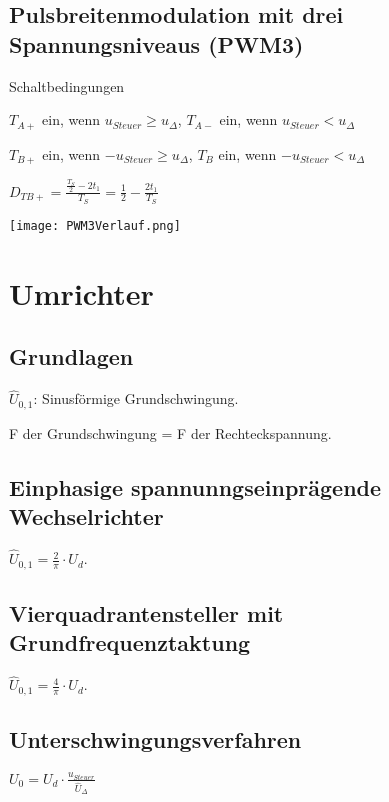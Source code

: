 \documentclass[german]{latex4ei/latex4ei_sheet}
\begin{document}
	\begin{sectionbox}
		\subsection{Pulsbreitenmodulation mit drei Spannungsniveaus (PWM3)}
		\begin{bluebox}{Schaltbedingungen}
			\item $T_{A+}$ ein, wenn $u_{Steuer} \geq u_\Delta$, $T_{A-}$ ein, wenn $u_{Steuer} < u_\Delta$
			\item $T_{B+}$ ein, wenn $-u_{Steuer} \geq u_\Delta$, $T_{B}$ ein, wenn $-u_{Steuer} < u_\Delta$
			\item $D_{TB+} = \frac{\frac{T_S}{2}-2t_1}{T_S} = \frac{1}{2}-\frac{2t_1}{T_S}$
			\item \texttt{[image: PWM3Verlauf.png]}
		\end{bluebox}	
	\end{sectionbox}
\section{Umrichter}
\begin{sectionbox}
	\subsection{Grundlagen}
		\begin{bluebox}
			\item $\hat{U}_{0,1}$: Sinusförmige Grundschwingung.
			\item F der Grundschwingung = F der Rechteckspannung.		
		\end{bluebox}
	\subsection{Einphasige spannunngseinprägende Wechselrichter}
		\begin{bluebox}
			\item $\hat{U}_{0,1} = \frac{2}{\pi}\cdot U_d$.	
		\end{bluebox}
	\subsection{Vierquadrantensteller mit Grundfrequenztaktung}
		\begin{bluebox}
			\item $\hat{U}_{0,1} = \frac{4}{\pi}\cdot U_d$.	
		\end{bluebox}
	\subsection{Unterschwingungsverfahren}
		\begin{bluebox}
			\item $U_0 = U_d \cdot \frac{u_{Steuer}}{\hat{U}_\Delta}$
		\end{bluebox}
\end{sectionbox}


\end{document}
